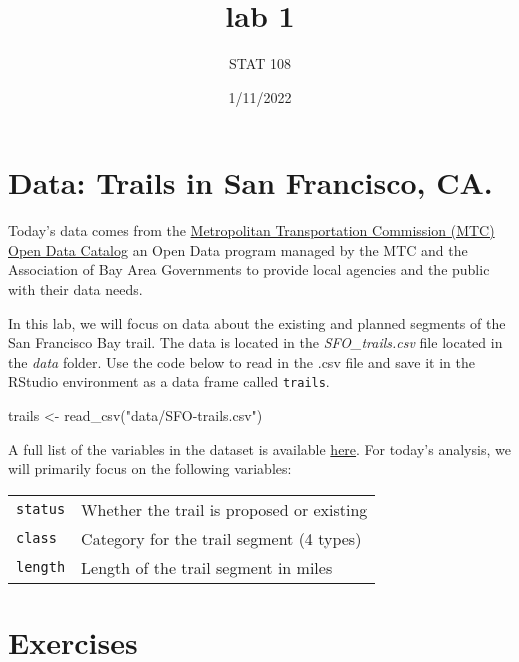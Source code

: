 \documentclass[
]{article}
\title{lab 1}
\author{STAT 108}
\date{1/11/2022}
\newenvironment{Shaded}{\begin{snugshade}}{\end{snugshade}}
\newcommand{\FunctionTok}[1]{\textcolor[rgb]{0.00,0.00,0.00}{#1}}
\newcommand{\NormalTok}[1]{#1}
\newcommand{\OtherTok}[1]{\textcolor[rgb]{0.56,0.35,0.01}{#1}}
\newcommand{\StringTok}[1]{\textcolor[rgb]{0.31,0.60,0.02}{#1}}
\begin{document}
\maketitle

\hypertarget{data-trails-in-san-francisco-ca.}{%
\section{Data: Trails in San Francisco,
CA.}\label{data-trails-in-san-francisco-ca.}}

Today's data comes from the
\href{https://opendata.mtc.ca.gov/datasets/MTC::san-francisco-bay-trail/about}{Metropolitan
Transportation Commission (MTC) Open Data Catalog} an Open Data program
managed by the MTC and the Association of Bay Area Governments to
provide local agencies and the public with their data needs.

In this lab, we will focus on data about the existing and planned
segments of the San Francisco Bay trail. The data is located in the
\emph{SFO\_trails.csv} file located in the \emph{data} folder. Use the
code below to read in the .csv file and save it in the RStudio
environment as a data frame called \texttt{trails}.

\begin{Shaded}
\begin{Highlighting}[]
\NormalTok{trails }\OtherTok{\textless{}{-}} \FunctionTok{read\_csv}\NormalTok{(}\StringTok{"data/SFO{-}trails.csv"}\NormalTok{)}
\end{Highlighting}
\end{Shaded}

A full list of the variables in the dataset is available
\href{https://opendata.mtc.ca.gov/datasets/MTC::san-francisco-bay-trail/about}{here}.
For today's analysis, we will primarily focus on the following
variables:

\begin{longtable}[]{@{}ll@{}}
\toprule()
\endhead
\texttt{status} & Whether the trail is proposed or existing \\
\texttt{class} & Category for the trail segment (4 types) \\
\texttt{length} & Length of the trail segment in miles \\
\bottomrule()
\end{longtable}

\hypertarget{exercises}{%
\section{Exercises}\label{exercises}}
\end{document}
